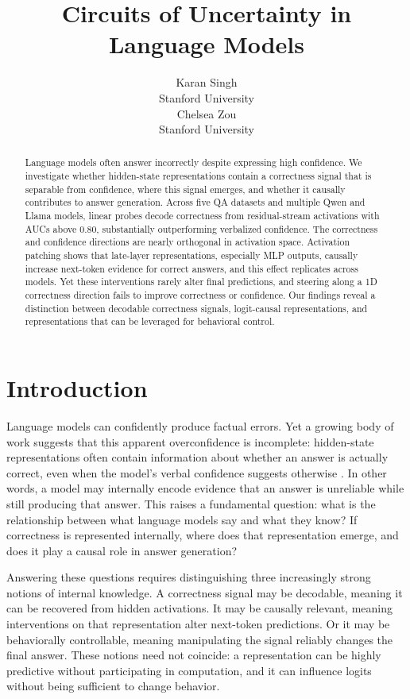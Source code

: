 \documentclass{article}
\title{Circuits of Uncertainty in Language Models}
\author{%
  Karan Singh \\
  Stanford University \\
  \And
  Chelsea Zou \\
  Stanford University
}
\begin{document}
\maketitle

\begin{abstract}
Language models often answer incorrectly despite expressing high confidence. We investigate whether hidden-state representations contain a correctness signal that is separable from confidence, where this signal emerges, and whether it causally contributes to answer generation. Across five QA datasets and multiple Qwen and Llama models, linear probes decode correctness from residual-stream activations with AUCs above 0.80, substantially outperforming verbalized confidence. The correctness and confidence directions are nearly orthogonal in activation space. Activation patching shows that late-layer representations, especially MLP outputs, causally increase next-token evidence for correct answers, and this effect replicates across models. Yet these interventions rarely alter final predictions, and steering along a 1D correctness direction fails to improve correctness or confidence. Our findings reveal a distinction between decodable correctness signals, logit-causal representations, and representations that can be leveraged for behavioral control.
\end{abstract}

\section{Introduction}

Language models can confidently produce factual errors. Yet a growing body of work suggests that this apparent overconfidence is incomplete: hidden-state representations often contain information about whether an answer is actually correct, even when the model’s verbal confidence suggests otherwise \citep{Azaria2023TheLying,Burns2024DiscoveringSupervision,Marks2024TheDatasets}. In other words, a model may internally encode evidence that an answer is unreliable while still producing that answer. This raises a fundamental question: what is the relationship between what language models say and what they know? If correctness is represented internally, where does that representation emerge, and does it play a causal role in answer generation?

Answering these questions requires distinguishing three increasingly strong notions of internal knowledge. A correctness signal may be decodable, meaning it can be recovered from hidden activations. It may be causally relevant, meaning interventions on that representation alter next-token predictions. Or it may be behaviorally controllable, meaning manipulating the signal reliably changes the final answer. These notions need not coincide: a representation can be highly predictive without participating in computation, and it can influence logits without being sufficient to change behavior.
\end{document}
